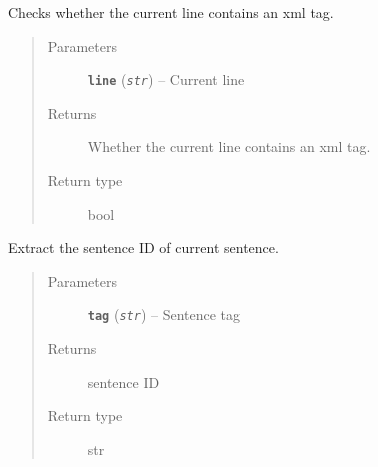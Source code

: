 \documentclass[letterpaper,10pt,english]{sphinxmanual}
\begin{document}

\begin{fulllineitems}
\label{src.misc:src.misc.helpers.contains_tag}
Checks whether the current line contains an xml tag.
\begin{quote}\begin{description}
\item[{Parameters}] \leavevmode
\textbf{\texttt{line}} (\emph{\texttt{str}}) -- Current line

\item[{Returns}] \leavevmode
Whether the current line contains an xml tag.

\item[{Return type}] \leavevmode
bool

\end{description}\end{quote}

\end{fulllineitems}


\begin{fulllineitems}
\label{src.misc:src.misc.helpers.extract_sentence_id}
Extract the sentence ID of current sentence.
\begin{quote}\begin{description}
\item[{Parameters}] \leavevmode
\textbf{\texttt{tag}} (\emph{\texttt{str}}) -- Sentence tag

\item[{Returns}] \leavevmode
sentence ID

\item[{Return type}] \leavevmode
str

\end{description}\end{quote}

\end{fulllineitems}


\begin{fulllineitems}
\label{src.misc:src.misc.helpers.load_vectors_from_model}
\end{fulllineitems}
\end{document}
